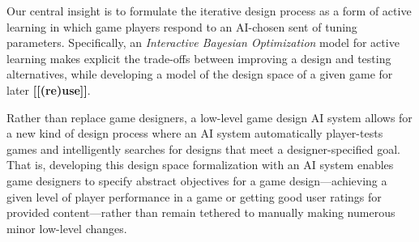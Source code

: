 \documentclass{sig-alternate}
\newcommand{\mytodo}[1]{\textbf{[[#1]]}}
\begin{document}
\noindent
Our central insight is to formulate the iterative design process as a form of active learning in which game players respond to an AI-chosen sent of tuning parameters.
Specifically, an {\em Interactive Bayesian Optimization} model for active learning makes explicit the trade-offs between improving a design and testing alternatives, while developing a model of the design space of a given game for later \mytodo{(re)use}.
%

Rather than replace game designers, a low-level game design AI system allows for a new kind of design process where an AI system automatically player-tests games and intelligently searches for designs that meet a designer-specified goal. 
That is, developing this design space formalization with an AI system enables game designers to specify abstract objectives for a game design---achieving a given level of player performance in a game or getting good user ratings for provided content---rather than remain tethered to manually making numerous minor low-level changes.
\end{document}

